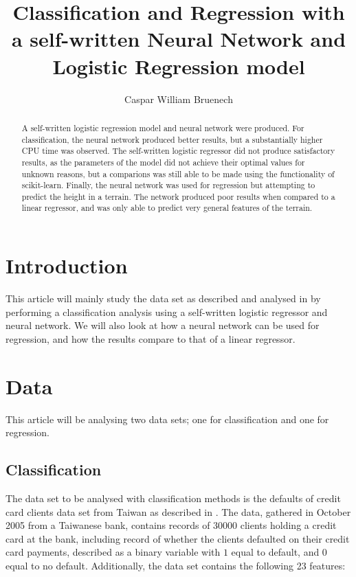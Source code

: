 \documentclass[a4paper,10pt,english]{article}
\title{Classification and Regression with a self-written Neural Network and Logistic Regression model}
\author{Caspar William Bruenech}
\begin{document}
\maketitle

\begin{abstract}
    A self-written logistic regression model and neural network were produced. For classification, the neural network produced better results, but a substantially higher CPU time was observed. The self-written logistic regressor did not produce satisfactory results, as the parameters of the model did not achieve their optimal values for unknown reasons, but a comparions was still able to be made using the functionality of scikit-learn. Finally, the neural network was used for regression but attempting to predict the height in a terrain. The network produced poor results when compared to a linear regressor, and was only able to predict very general features of the terrain.
\end{abstract}

\section{Introduction}

This article will mainly study the data set as described and analysed in \cite{Yeh2009} by performing a classification analysis using a self-written logistic regressor and neural network. We will also look at how a neural network can be used for regression, and how the results compare to that of a linear regressor. 

\section{Data}

This article will be analysing two data sets; one for classification and one for regression. 

\subsection{Classification}

The data set to be analysed with classification methods is the defaults of credit card clients data set from Taiwan as described in \cite{Yeh2009}. The data, gathered in October 2005 from a Taiwanese bank, contains records of 30000 clients holding a credit card at the bank, including record of whether the clients defaulted on their credit card payments, described as a binary variable with $1$ equal to default, and $0$ equal to no default. Additionally, the data set contains the following 23 features:
\end{document}
